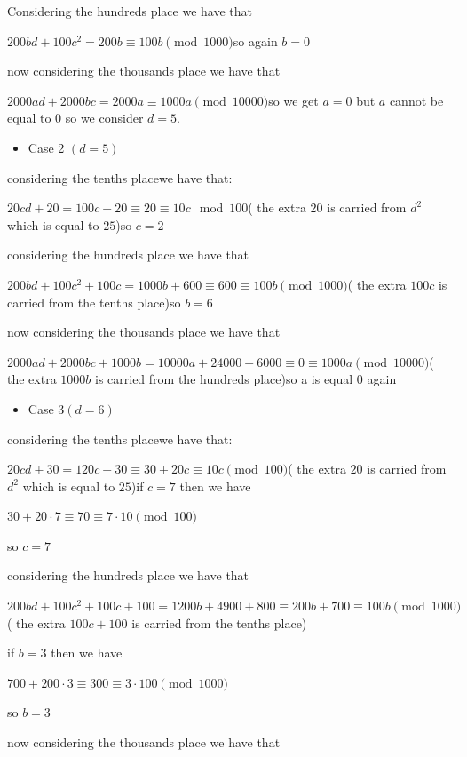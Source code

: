 \begin{enumerate}
 Considering the hundreds place we have that 

 $200bd+100c^2= 200b \equiv 100b \pmod{1000}$so again $b=0$

 now considering the thousands place we have that 

 $2000ad+2000bc = 2000a \equiv 1000a \pmod {10000}$so we get $a=0$ but $a$ cannot be equal to $0$ so we consider $d=5.$

            \begin{itemize}
        \item Case 2 $(d=5)$
            \end{itemize}
            considering the tenths placewe have that:

 $20cd+20=100c+20\equiv 20 \equiv 10c \mod  {100}$( the extra $20$ is carried from $d^2$ which is equal to $25$)so $c=2$

 considering the hundreds place we have that 

 $200bd+100c^2+100c= 1000b+600 \equiv600\equiv 100b \pmod{1000}$( the extra $100c$ is carried from the tenths place)so $b=6$

 now considering the thousands place we have that 

 $2000ad+2000bc +1000b= 10000a+24000+ 6000\equiv0\equiv 1000a \pmod {10000}$( the extra $1000b$ is carried from the hundreds place)so a is equal 0 again

 
            \begin{itemize}
        \item Case 3$(d=6)$
            \end{itemize}
            considering the tenths placewe have that:

 $20cd+30=120c+30\equiv 30+20c \equiv 10c \pmod {100}$( the extra $20$ is carried from $d^2$ which is equal to $25$)if $c=7$ then we have 

 $30+20 \cdot 7 \equiv 70\equiv7 \cdot 10 \pmod{100}$

 so $c=7$

 considering the hundreds place we have that 

 $200bd+100c^2+100c+100= 1200b+4900+800 \equiv200b+700\equiv 100b \pmod{1000}$( the extra $100c+100$ is carried from the tenths place)

 if $b=3$ then we have 

 $700+200 \cdot 3 \equiv 300\equiv3 \cdot 100 \pmod {1000}$

 so $b=3$

 now considering the thousands place we have that 


\end{enumerate}
